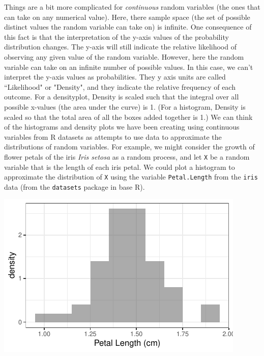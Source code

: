 \documentclass[twoside]{book}\usepackage[]{graphicx}\usepackage[]{xcolor}
\makeatletter
\def\maxwidth{ %
  \ifdim\Gin@nat@width>\linewidth
    \linewidth
  \else
    \Gin@nat@width
  \fi
}
\newenvironment{knitrout}{}{} %
\newcommand{\Rindex}[1]{\index{\texttt{#1}}}
\newcommand{\dataframe}[1]{{\color{blue!80!black}\texttt{#1}}\Rindex{#1}}
\newcommand{\pkg}[1]{{\color{red!80!black}\texttt{#1}}\Rindex{#1}}
\newcounter{example}[section]
\makeatother
\begin{document}
Things are a bit more complicated for \emph{continuous} random variables (the ones that can take on any numerical value).  Here, there sample space (the set of possible distinct values the random variable can take on) is infinite.  One consequence of this fact is that the interpretation of the y-axis values of the probability distribution changes.  The y-axis will still indicate the relative likelihood of observing any given value of the random variable.  However, here the random variable can take on an infinite number of possible values.  In this case, we can't interpret the y-axis values as probabilities.  They y axis units are called ``Likelihood" or "Density", and they indicate the relative frequency of each outcome. For a densityplot, Density is scaled such that the integral over all possible x-values (the area under the curve) is 1. (For a histogram, Density is scaled so that the total area of all the boxes added together is 1.)  We can think of the histograms and density plots we have been creating using continuous variables from R datasets as attempts to use data to approximate the distributions of random variables.  For example, we might consider the growth of flower petals of the iris \textit{Iris setosa} as a random process, and let \texttt{X} be a random variable that is the length of each iris petal.  We could plot a histogram to approximate the distribution of \texttt{X} using the variable \texttt{Petal.Length} from the \dataframe{iris} data (from the \pkg{datasets} package in base R).

\begin{knitrout}
\color{fgcolor}

{\centering \includegraphics[width=\maxwidth]{figures/fig-cont-pdf-1} 

}



\end{knitrout}
\end{document}

